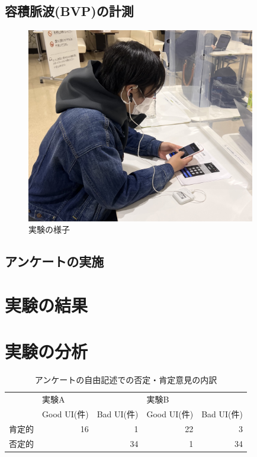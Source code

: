 \subsection{容積脈波(BVP)の計測}

\begin{figure}[htbp]
  \begin{minipage}{\hsize}
    \begin{center}
       \includegraphics[width=100mm]{img/experience.jpg}
    \end{center}
    \caption{実験の様子}
    \label{fig:observe}
  \end{minipage}
\end{figure}

\subsection{アンケートの実施}

\section{実験の結果}

\section{実験の分析}

\begin{table}[htbp]
\centering
\begin{tabular}{llrlr}
\hline
    & \multicolumn{2}{l}{実験A}                             & \multicolumn{2}{l}{実験B}                             \\ \cline{2-5} 
    & Good UI(件)                & \multicolumn{1}{l}{Bad UI(件)} & Good UI(件)                & \multicolumn{1}{l}{Bad UI(件)} \\ \hline
肯定的 & \multicolumn{1}{r}{16} & 1                          & \multicolumn{1}{r}{22} & 3                          \\
否定的 & \multicolumn{1}{r}{}   & 34                         & \multicolumn{1}{r}{1}  & 34                         \\ \hline
\end{tabular}
\caption{アンケートの自由記述での否定・肯定意見の内訳}
\label{table:negaposi}
\end{table}

